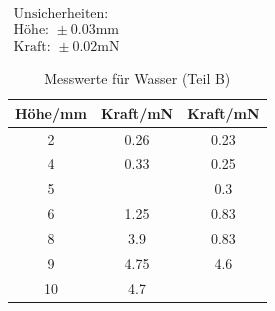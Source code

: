 \documentclass[11pt,a4paper]{article}
\begin{document}
\begin{table}[h]
\centering
\caption{Messwerte für Wasser (Teil B)} \vspace{11pt}
$\begin{array}{l}
\textrm{Unsicherheiten:}\\
\textrm{Höhe: } \pm 0.03 \textrm{mm}\\
\textrm{Kraft: } \pm 0.02 \textrm{mN}
\end{array}$
\begin{tabular}{ccc}
\toprule
\textrm{H\"ohe}/\textrm{mm}& \textrm{Kraft}/\textrm{mN} & \textrm{Kraft}/\textrm{mN} \\
\midrule 
2 & 0.26 & 0.23\\
\hline
4 & 0.33 & 0.25\\
\hline 
5 & & 0.3\\
\hline 
6 & 1.25 & 0.83\\
\hline 
8 & 3.9 & 0.83\\ 
\hline
9 & 4.75 & 4.6\\ 
\hline
10 & 4.7 &\\ 
\bottomrule
\end{tabular}
\label{tabmw}
\end{table}
\end{document}
